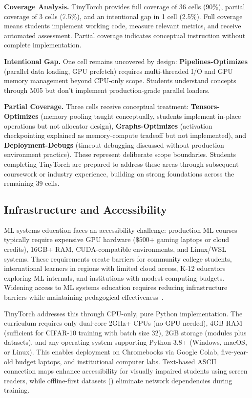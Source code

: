 \documentclass[10pt,twocolumn]{article}
\begin{document}
\textbf{Coverage Analysis.} TinyTorch provides full coverage of 36 cells (90\%), partial coverage of 3 cells (7.5\%), and an intentional gap in 1 cell (2.5\%). Full coverage means students implement working code, measure relevant metrics, and receive automated assessment. Partial coverage indicates conceptual instruction without complete implementation.

\textbf{Intentional Gap.} One cell remains uncovered by design: \textbf{Pipelines-Optimizes} (parallel data loading, GPU prefetch) requires multi-threaded I/O and GPU memory management beyond CPU-only scope. Students understand concepts through M05 but don't implement production-grade parallel loaders.

\textbf{Partial Coverage.} Three cells receive conceptual treatment: \textbf{Tensors-Optimizes} (memory pooling taught conceptually, students implement in-place operations but not allocator design), \textbf{Graphs-Optimizes} (activation checkpointing explained as memory-compute tradeoff but not implemented), and \textbf{Deployment-Debugs} (timeout debugging discussed without production environment practice). These represent deliberate scope boundaries. Students completing TinyTorch are prepared to address these areas through subsequent coursework or industry experience, building on strong foundations across the remaining 39 cells.

\subsection{Infrastructure and Accessibility}
\label{subsec:infrastructure}

ML systems education faces an accessibility challenge: production ML courses typically require expensive GPU hardware (\$500+ gaming laptops or cloud credits), 16GB+ RAM, CUDA-compatible environments, and Linux/WSL systems. These requirements create barriers for community college students, international learners in regions with limited cloud access, K-12 educators exploring ML internals, and institutions with modest computing budgets. Widening access to ML systems education requires reducing infrastructure barriers while maintaining pedagogical effectiveness~\citep{janapa_reddi2022}.

TinyTorch addresses this through CPU-only, pure Python implementation. The curriculum requires only dual-core 2GHz+ CPUs (no GPU needed), 4GB RAM (sufficient for CIFAR-10 training with batch size 32), 2GB storage (modules plus datasets), and any operating system supporting Python 3.8+ (Windows, macOS, or Linux). This enables deployment on Chromebooks via Google Colab, five-year-old budget laptops, and institutional computer labs. Text-based ASCII connection maps enhance accessibility for visually impaired students using screen readers, while offline-first datasets () eliminate network dependencies during training.
\end{document}
